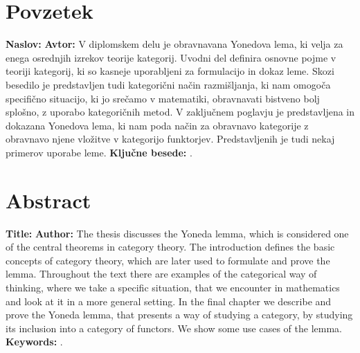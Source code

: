 \documentclass[../kategoricna_logika.tex]{subfiles}
\begin{document}
\chapter*{Povzetek}
%
\noindent\textbf{Naslov:} \ttitle
\bigskip
%
\noindent\textbf{Avtor:} \tauthor
\bigskip
%
\noindent
V diplomskem delu je obravnavana Yonedova lema, ki velja za enega osrednjih izrekov teorije kategorij. Uvodni del definira osnovne pojme v teoriji kategorij, ki so kasneje uporabljeni za formulacijo in dokaz leme. Skozi besedilo je predstavljen tudi kategorični način razmišljanja, ki nam omogoča specifično situacijo, ki jo srečamo v matematiki, obravnavati bistveno bolj splošno, z uporabo kategoričnih metod.
V zaključnem poglavju je predstavljena in dokazana Yonedova lema, ki nam poda način za obravnavo kategorije z obravnavo njene vložitve v kategorijo funktorjev. Predstavljenih je tudi nekaj primerov uporabe leme.
\bigskip
%
\noindent\textbf{Ključne besede:} \tkeywords.
\clearemptydoublepage
%
\chapter*{Abstract}
%
\noindent\textbf{Title:} \ttitleEn
\bigskip
%
\noindent\textbf{Author:} \tauthor
\bigskip
%
\noindent 
The thesis discusses the Yoneda lemma, which is considered one of the central theorems in category theory. The introduction defines the basic concepts of category theory, which are later used to formulate and prove the lemma. Throughout the text there are examples of the categorical way of thinking, where we take a specific situation, that we encounter in mathematics and look at it in a more general setting. In the final chapter we describe and prove the Yoneda lemma, that presents a way of studying a category, by studying its inclusion into a category of functors. We show some use cases of the lemma.
%
\bigskip
%
\noindent\textbf{Keywords:} \tkeywordsEn.
\clearemptydoublepage
\end{document}
